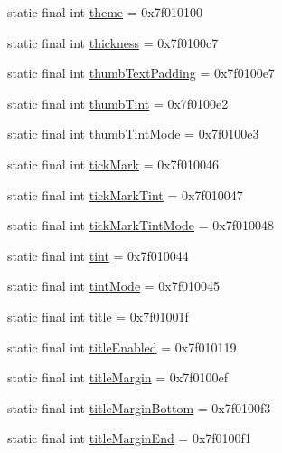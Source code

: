 \begin{CompactItemize}
static final int \hyperlink{classcom_1_1companyname_1_1x__2doo_1_1_r_1_1attr_4a2ef07a359ea32f3e0192bc0bcb189e}{theme} = 0x7f010100
\item 
static final int \hyperlink{classcom_1_1companyname_1_1x__2doo_1_1_r_1_1attr_ebe368917b104183cc0d9e8f392b784e}{thickness} = 0x7f0100c7
\item 
static final int \hyperlink{classcom_1_1companyname_1_1x__2doo_1_1_r_1_1attr_319bea80a72e815d2f7105ebe93e1ac0}{thumbTextPadding} = 0x7f0100e7
\item 
static final int \hyperlink{classcom_1_1companyname_1_1x__2doo_1_1_r_1_1attr_5ff50a30d9f3d2beb618a6e0700b7ab7}{thumbTint} = 0x7f0100e2
\item 
static final int \hyperlink{classcom_1_1companyname_1_1x__2doo_1_1_r_1_1attr_169fcb550f77b4c98b327a51a75a2c53}{thumbTintMode} = 0x7f0100e3
\item 
static final int \hyperlink{classcom_1_1companyname_1_1x__2doo_1_1_r_1_1attr_9b271e9b56cb4bf955480a269eb005a4}{tickMark} = 0x7f010046
\item 
static final int \hyperlink{classcom_1_1companyname_1_1x__2doo_1_1_r_1_1attr_8468cf7dcc47f0da7291e4e7f59e235d}{tickMarkTint} = 0x7f010047
\item 
static final int \hyperlink{classcom_1_1companyname_1_1x__2doo_1_1_r_1_1attr_dbe326d1dc87f4553866734cdb38566f}{tickMarkTintMode} = 0x7f010048
\item 
static final int \hyperlink{classcom_1_1companyname_1_1x__2doo_1_1_r_1_1attr_80a740d9824a3b6ca2a2cd6aa7e45000}{tint} = 0x7f010044
\item 
static final int \hyperlink{classcom_1_1companyname_1_1x__2doo_1_1_r_1_1attr_868f3e42c76b8f45c9b87ae88a5741aa}{tintMode} = 0x7f010045
\item 
static final int \hyperlink{classcom_1_1companyname_1_1x__2doo_1_1_r_1_1attr_d23b9d3aaa28f1e83be97e20f187059b}{title} = 0x7f01001f
\item 
static final int \hyperlink{classcom_1_1companyname_1_1x__2doo_1_1_r_1_1attr_9e3b3c0bb26eb0c922eff68cc77593b9}{titleEnabled} = 0x7f010119
\item 
static final int \hyperlink{classcom_1_1companyname_1_1x__2doo_1_1_r_1_1attr_3b6c3eb95c01aad475eb671f3df86055}{titleMargin} = 0x7f0100ef
\item 
static final int \hyperlink{classcom_1_1companyname_1_1x__2doo_1_1_r_1_1attr_3ea062127ccb277197dfc6e078435b34}{titleMarginBottom} = 0x7f0100f3
\item 
static final int \hyperlink{classcom_1_1companyname_1_1x__2doo_1_1_r_1_1attr_b4cc2c5b20355d90648de083289a42b4}{titleMarginEnd} = 0x7f0100f1

\end{CompactItemize}
